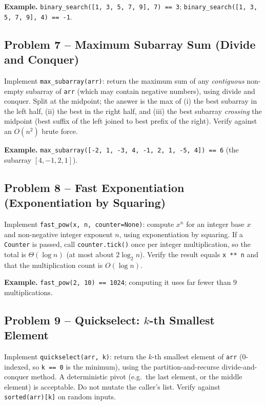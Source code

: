 \documentclass[11pt]{article}
\begin{document}
\textbf{Example.} \texttt{binary\_search([1, 3, 5, 7, 9], 7) == 3};
\texttt{binary\_search([1, 3, 5, 7, 9], 4) == -1}.

\subsection*{Problem 7 -- Maximum Subarray Sum (Divide and Conquer)}

Implement \texttt{max\_subarray(arr)}: return the maximum sum of any \emph{contiguous}
non-empty subarray of \texttt{arr} (which may contain negative numbers), using divide and
conquer. Split at the midpoint; the answer is the max of (i) the best subarray in the left
half, (ii) the best in the right half, and (iii) the best subarray \emph{crossing} the
midpoint (best suffix of the left joined to best prefix of the right). Verify against an
$O(n^2)$ brute force.

\textbf{Example.} \texttt{max\_subarray([-2, 1, -3, 4, -1, 2, 1, -5, 4]) == 6} (the subarray
$[4, -1, 2, 1]$).

\subsection*{Problem 8 -- Fast Exponentiation (Exponentiation by Squaring)}

Implement \texttt{fast\_pow(x, n, counter=None)}: compute $x^n$ for an integer base $x$ and
non-negative integer exponent $n$, using exponentiation by squaring. If a \texttt{Counter}
is passed, call \texttt{counter.tick()} once per integer multiplication, so the total is
$\Theta(\log n)$ (at most about $2\log_2 n$). Verify the result equals \texttt{x ** n} and
that the multiplication count is $O(\log n)$.

\textbf{Example.} \texttt{fast\_pow(2, 10) == 1024}; computing it uses far fewer than $9$
multiplications.

\subsection*{Problem 9 -- Quickselect: $k$-th Smallest Element}

Implement \texttt{quickselect(arr, k)}: return the $k$-th smallest element of \texttt{arr}
($0$-indexed, so \texttt{k == 0} is the minimum), using the partition-and-recurse
divide-and-conquer method. A deterministic pivot (e.g.\ the last element, or the middle
element) is acceptable. Do not mutate the caller's list. Verify against
\texttt{sorted(arr)[k]} on random inputs.
\end{document}
